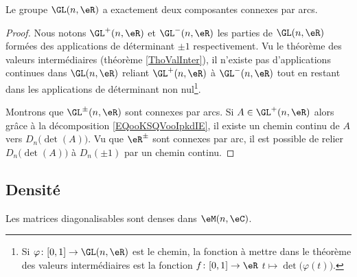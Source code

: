 \begin{proposition} \label{PROPooBIYQooWLndSW}
    Le groupe \( \GL(n,\eR)\) a exactement deux composantes connexes par arcs.
\end{proposition}

\begin{proof}
    Nous notons \( \GL^+(n,\eR)\) et \( \GL^-(n,\eR)\) les parties de \( \GL(n,\eR)\) formées des applications de déterminant \( \pm1\) respectivement. Vu le théorème des valeurs intermédiaires (théorème \ref{ThoValInter}), il n'existe pas d'applications continues dans \( \GL(n,\eR)\) reliant \( \GL^+(n,\eR)\) à \( \GL^-(n,\eR)\) tout en restant dans les applications de déterminant non nul\footnote{Si \( \varphi\colon \mathopen[ 0 , 1 \mathclose]\to \GL(n,\eR)\) est le chemin, la fonction à mettre dans le théorème des valeurs intermédiaires est la fonction \( f\colon \mathopen[ 0 , 1 \mathclose]\to \eR\) \(t\mapsto \det\big( \varphi(t) \big)\).}.

    Montrons que \( \GL^{\pm}(n,\eR)\) sont connexes par arcs. Si \( A\in\GL^+(n,\eR)\) alors grâce à la décomposition \eqref{EQooKSQVooIpkdIE}, il existe un chemin continu de \( A\) vers \( D_n\big( \det(A) \big)\). Vu que \( \eR^{\pm}\) sont connexes par arc, il est possible de relier \( D_n\big( \det(A) \big)\) à \( D_n(\pm 1)\) par un chemin continu.
\end{proof}

\subsection{Densité}

\begin{proposition}     \label{PropDigDensVxzPuo}
    Les matrices diagonalisables sont denses dans \( \eM(n,\eC)\).
\end{proposition}

